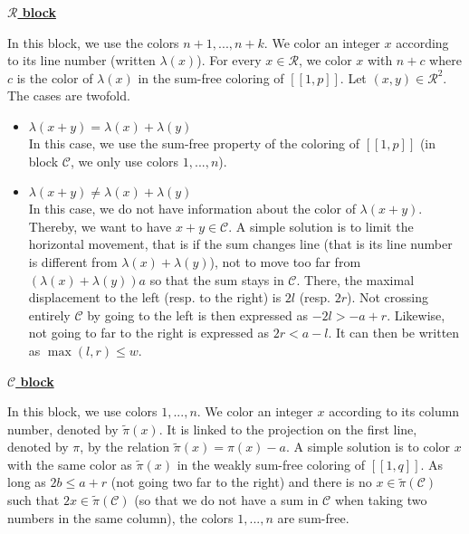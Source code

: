 \noindent \underline{\textbf{\(\mathcal{R}\) block}}
\par
In this block,  we use the colors \(n + 1, ..., n + k\). We color an integer \(x\) according to its line number (written \(\lambda(x)\)).
For every \(x \in \mathcal{R}\), we color \(x\) with \(n + c\) where \(c\) is the color of \(\lambda(x)\) in the sum-free coloring of  \([\![1,p]\!]\).
Let \((x, y) \in \mathcal{R}^2\). The cases are twofold.

\begin{itemize}
	\item \underline{\(\lambda(x+y) = \lambda(x) + \lambda(y)\)} \\
	In this case, we use the sum-free property of the coloring of \([\![1,p]\!]\) (in block \(\mathcal{C}\), we only 
	use colors \(1, ..., n\)).
	\item \underline{\(\lambda(x+y) \neq \lambda(x) + \lambda(y)\)} \\
	In this case, we do not have information about the color of \(\lambda(x+y)\). Thereby, we want to have 
	\(x+y \in \mathcal{C}\). A simple solution is to limit the horizontal movement, that is if the sum changes line 
	(that is its line number is different from \(\lambda(x) + \lambda(y)\)), not to move too far from \((\lambda(x) 
	+ \lambda(y)) a\) so that the sum stays in \(\mathcal{C}\). There, the maximal displacement to the left (resp. 
	to the right) is \(2l\) (resp. \(2r\)). Not crossing entirely \(\mathcal{C}\) by going to the left is then expressed 
	as \(-2l > -a + r\). Likewise, not going to far to the right is expressed as \(2r < a - l\). It can then be written 
	as \(\max(l, r) \leqslant w\).
\end{itemize}

\noindent \underline{\textbf{\(\mathcal{C}\) block}}
\par
In this block,  we use colors \(1, ..., n\). We color an integer \(x\) according to its column number, denoted by \(\tilde{\pi}(x)\). It is linked to the
projection on the first line, denoted by \(\pi\), by the relation \(\tilde{\pi}(x) = \pi(x) - a\). A simple solution is to color \(x\) with the same color
as \(\tilde{\pi}(x)\) in the weakly sum-free coloring of \([\![1,q]\!]\). As long as \(2b \leqslant a + r\) (not going two far to the right) and there
is no \(x \in \tilde{\pi}(\mathcal{C})\) such that \(2x \in \tilde{\pi}(\mathcal{C})\) (so that we do not have a sum in \(\mathcal{C}\) when
taking two numbers in the same column), the colors \(1, ..., n\) are sum-free.

